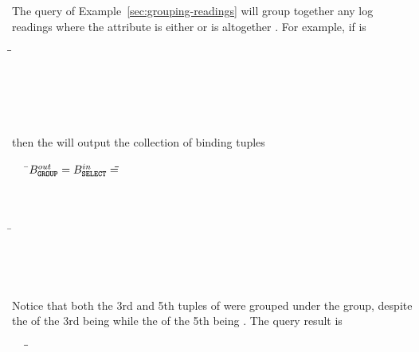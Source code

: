 \begin{example}
\label{xmpl:grouping-null-missing}
The query of Example~\ref{sec:grouping-readings} will group together any log
readings where the  attribute is either \NULL or is altogether
\MISSING. For example, if  is
\begin{tabbing}
\=\gl{[ }\=\\
\>\>\\
\>\>\\
\>\>\\
\>\>\\
\>\gl{]}
\end{tabbing}
\noindent then the  will output the collection of binding tuples
\begin{tabbing}
\ \ \ \=$B^{out}_{\texttt{\textbf{GROUP}}} = B^{in}_{\texttt{\textbf{SELECT}}} =$\=\gt{\ob }\=\=\\ 
\>\>\>\>\\
\>\>\>\>\gt{\cb $\rangle$,}\\
\>\>\>\\
\>\>\>\=\\
\>\>\>\>\\
\>\>\>\>\gt{\cb $\rangle$} \\
\>\>\gt{\cb}\\
\end{tabbing}
\noindent Notice that both the 3rd and 5th tuples of  were grouped
under the  group, despite the  of the 3rd being \NULL
while the  of the 5th being \MISSING. The query result is 
\begin{tabbing}
\ \ \ \=\gt{\ob }\=\\
\>\>\\
\>\>\\
\>\gt{\cb}
\end{tabbing}


\end{example}
